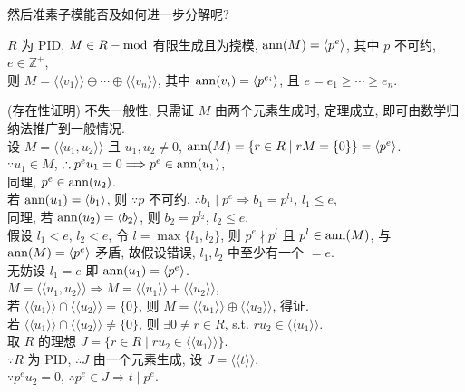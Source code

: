 \documentclass{note}
\begin{document}
然后准素子模能否及如何进一步分解呢?

\begin{thm}[(课本定理 6.11)]\label{thm-6.11}
    $R$ 为 PID, $M\in R-\operatorname{mod}$ 有限生成且为挠模, $\operatorname{ann}(M)=\langle p^e\rangle$, 其中 $p$ 不可约, $e\in\mathbb{Z}^+$,\\
    则 $M=\langle\langle v_1\rangle\rangle\oplus\cdots\oplus\langle\langle v_n\rangle\rangle$, 其中 $\operatorname{ann}(v_i)=\langle p^{e_i}\rangle$, 且 $e=e_1\geq\cdots\geq e_n$.
\end{thm}
\begin{pf}(存在性证明)
    不失一般性, 只需证 $M$ 由两个元素生成时, 定理成立, 即可由数学归纳法推广到一般情况.\\
    设 $M=\langle\langle u_1,u_2\rangle\rangle$ 且 $u_1,u_2\neq 0$, $\operatorname{ann}(M)=\{r\in R\mid rM=\{0\}\}=\langle p^e\rangle$.\\
    $\because u_1\in M$, $\therefore p^eu_1=0\Longrightarrow p^e\in\operatorname{ann}(u_1)$,\\
    同理, $p^e\in\operatorname{ann}(u_2)$.\\
    若 $\operatorname{ann}(u_1)=\langle b_1\rangle$, 则 $\because p$ 不可约, $\therefore b_1\mid p^e\Longrightarrow b_1=p^{l_1}$, $l_1\leq e$,\\
    同理, 若 $\operatorname{ann}(u_2)=\langle b_2\rangle$, 则 $b_2=p^{l_2}$, $l_2\leq e$.\\
    假设 $l_1<e$, $l_2<e$, 令 $l=\max\{l_1,l_2\}$, 则 $p^e\nmid p^l$ 且 $p^l\in\operatorname{ann}(M)$, 与 $\operatorname{ann}(M)=\langle p^e\rangle$ 矛盾, 故假设错误, $l_1,l_2$ 中至少有一个 $=e$.\\
    无妨设 $l_1=e$ 即 $\operatorname{ann}(u_1)=\langle p^e\rangle$.\\
    $M=\langle\langle u_1,u_2\rangle\rangle\Longrightarrow M=\langle\langle u_1\rangle\rangle+\langle\langle u_2\rangle\rangle$,\\
    若 $\langle\langle u_1\rangle\rangle\cap\langle\langle u_2\rangle\rangle=\{0\}$, 则 $M=\langle\langle u_1\rangle\rangle\oplus\langle\langle u_2\rangle\rangle$, 得证.\\
    若 $\langle\langle u_1\rangle\rangle\cap\langle\langle u_2\rangle\rangle\neq\{0\}$, 则 $\exists 0\neq r\in R$, s.t. $ru_2\in\langle\langle u_1\rangle\rangle$.\\
    取 $R$ 的理想 $J=\{r\in R\mid ru_2\in\langle\langle u_1\rangle\rangle\}$.\\
    $\because R$ 为 PID, $\therefore J$ 由一个元素生成, 设 $J=\langle\langle t\rangle\rangle$.\\
    $\because p^eu_2=0$, $\therefore p^e\in J\Longrightarrow t\mid p^e$.\\

\end{pf}
\end{document}
